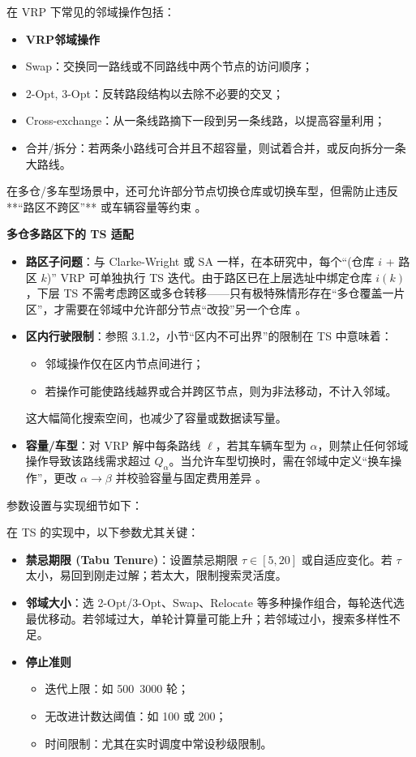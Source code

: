 \documentclass[12pt,a4paper,twoside]{ctexbook}
\begin{document}
    在 VRP 下常见的邻域操作包括：
    \begin{itemize}
    \item \textbf{VRP邻域操作}
        \item Swap：交换同一路线或不同路线中两个节点的访问顺序；
        \item 2-Opt, 3-Opt：反转路段结构以去除不必要的交叉；
        \item Cross-exchange：从一条线路摘下一段到另一条线路，以提高容量利用；
        \item 合并/拆分：若两条小路线可合并且不超容量，则试着合并，或反向拆分一条大路线。
    \end{itemize}
    在多仓/多车型场景中，还可允许部分节点切换仓库或切换车型，但需防止违反**“路区不跨区”** 或车辆容量等约束 \cite{golden2008vehicle}。

\textbf{多仓多路区下的 TS 适配}

\begin{itemize}
    \item \textbf{路区子问题}：与 Clarke-Wright 或 SA 一样，在本研究中，每个“(仓库 $i$ + 路区 $k$)” VRP 可单独执行 TS 迭代。由于路区已在上层选址中绑定仓库 $i(k)$，下层 TS 不需考虑跨区或多仓转移——只有极特殊情形存在“多仓覆盖一片区”，才需要在邻域中允许部分节点“改投”另一个仓库 \cite{vidal2013hybrid}。
    \item \textbf{区内行驶限制}：参照 3.1.2，小节“区内不可出界”的限制在 TS 中意味着：
    \begin{itemize}
        \item 邻域操作仅在区内节点间进行；
        \item 若操作可能使路线越界或合并跨区节点，则为非法移动，不计入邻域。
    \end{itemize}
    这大幅简化搜索空间，也减少了容量或数据读写量。
    \item \textbf{容量/车型}：对 VRP 解中每条路线 $\ell$，若其车辆车型为 $\alpha$，则禁止任何邻域操作导致该路线需求超过 $Q_\alpha$。当允许车型切换时，需在邻域中定义“换车操作”，更改 $\alpha \to \beta$ 并校验容量与固定费用差异 \cite{toth2014vehicle}。

\end{itemize}
参数设置与实现细节如下：

在 TS 的实现中，以下参数尤其关键：
\begin{itemize}
    \item \textbf{禁忌期限 (Tabu Tenure)}：设置禁忌期限 $\tau \in [5,20]$ 或自适应变化。若 $\tau$ 太小，易回到刚走过解；若太大，限制搜索灵活度。
    \item \textbf{邻域大小}：选 2-Opt/3-Opt、Swap、Relocate 等多种操作组合，每轮迭代选最优移动。若邻域过大，单轮计算量可能上升；若邻域过小，搜索多样性不足。
    \item \textbf{停止准则}
    \begin{itemize}
        \item 迭代上限：如 500~3000 轮；
        \item 无改进计数达阈值：如 100 或 200；
        \item 时间限制：尤其在实时调度中常设秒级限制。
    \end{itemize}
\end{itemize}
\end{document}
